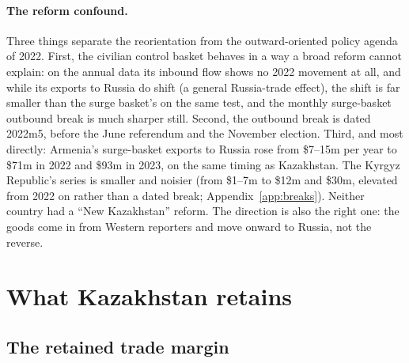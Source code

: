 \documentclass[12pt]{article}
\begin{document}
\paragraph{The reform confound.} Three things separate the reorientation from the
outward-oriented policy agenda of 2022. First, the civilian control basket behaves in a way a
broad reform cannot explain: on the annual data its inbound flow shows no 2022 movement at all, and
while its exports to Russia do shift (a general Russia-trade effect), the shift is far
smaller than the surge basket's on the same test, and the monthly surge-basket outbound break
is much sharper still. Second, the outbound
break is dated 2022m5, before the June referendum and the November election. Third, and most
directly: Armenia's surge-basket exports to Russia rose from \$7--15m per year to \$71m in
2022 and \$93m in 2023, on the same timing as Kazakhstan. The Kyrgyz Republic's series is smaller and noisier (from \$1--7m to \$12m and \$30m, elevated from 2022 on rather than a dated break; Appendix~\ref{app:breaks}). Neither country had a ``New Kazakhstan'' reform. The direction is also the right one: the
goods come in from Western reporters and move onward to Russia, not the reverse.

\section{What Kazakhstan retains}\label{sec:capture}

\subsection{The retained trade margin}
\end{document}
